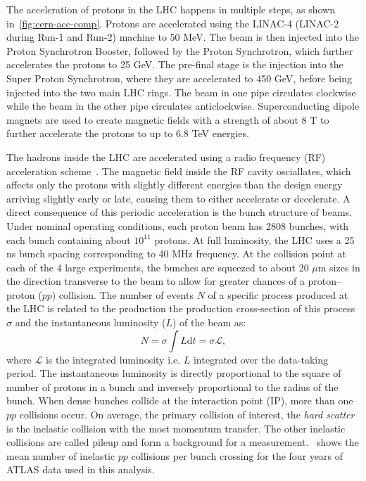 The acceleration of protons in the LHC happens in multiple steps, as shown in~\cref{fig:cern-acc-comp}. Protons are accelerated using the LINAC-4 (LINAC-2 during Run-1 and Run-2) machine to 50 MeV. The beam is then injected into the Proton Synchrotron Booster, followed by the Proton Synchrotron, which further accelerates the protons to 25 GeV. The pre-final stage is the injection into the Super Proton Synchrotron, where they are accelerated to 450 GeV, before being injected into the two main LHC rings. The beam in one pipe circulates clockwise while the beam in the other pipe circulates anticlockwise. Superconducting dipole magnets are used to create magnetic fields with a strength of about 8 T to further accelerate the protons to up to 6.8 TeV energies. 

The hadrons inside the LHC are accelerated using a radio frequency (RF) acceleration scheme~\cite{LHC}. The magnetic field inside the RF cavity osciallates, which affects only the protons with slightly different energies than the design energy arriving slightly early or late, causing them to either accelerate or decelerate. A direct consequence of this periodic acceleration is the bunch structure of beams. Under nominal operating conditions, each proton beam has 2808 bunches, with each bunch containing about $10^{11}$ protons. At full luminosity, the LHC uses a 25 ns bunch spacing corresponding to 40 MHz frequency. At the collision point at each of the 4 large experiments, the bunches are squeezed to about 20 $\mu$m sizes in the direction transverse to the beam to allow for greater chances of a proton--proton ($pp$) collision. The number of events $N$ of a specific process produced at the LHC is related to the production the production cross-section of this process $\sigma$ and the instantaneous luminosity ($L$) of the beam as:
\begin{equation}
    N = \sigma\int L \mathrm{d}t = \sigma \mathcal{L},
\end{equation}
where $\mathcal{L}$ is the integrated luminosity i.e. $L$ integrated over the data-taking period. The instantaneous luminosity is directly proportional to the square of number of protons in a bunch and inversely proportional to the radius of the bunch. When dense bunches collide at the interaction point (IP), more than one $pp$ collisions occur. On average, the primary collision of interest, the \textit{hard scatter} is the inelastic collision with the most momentum transfer. The other inelastic collisions are called pileup and form a background for a measurement.~ shows the mean number of inelastic $pp$ collisions per bunch crossing for the four years of ATLAS data used in this analysis.

